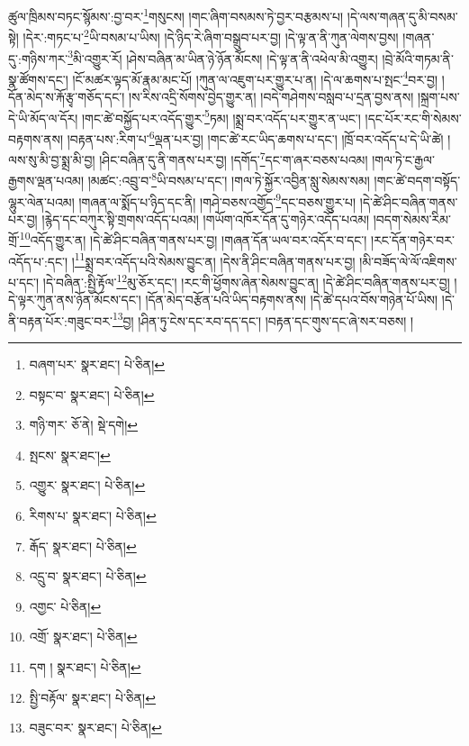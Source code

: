 ཚུལ་ཁྲིམས་བཏང་སྙོམས་:བྱ་བར་\footnote{བཞག་པར་  སྣར་ཐང་།  པེ་ཅིན། }གསུངས། །གང་ཞིག་བསམས་ཏེ་བྱར་བརྩམས་པ། །དེ་ལས་གཞན་དུ་མི་བསམ་སྟེ། །དེར་:གཏང་པ་\footnote{བསྟང་བ་  སྣར་ཐང་།  པེ་ཅིན། }ཡི་བསམ་པ་ཡིས། །དེ་ཉིད་རེ་ཞིག་བསྒྲུབ་པར་བྱ། །དེ་ལྟ་ན་ནི་ཀུན་ལེགས་བྱས། །གཞན་དུ་:གཉིས་ཀར་\footnote{གཉི་གར་  ཅོ་ནེ།  སྡེ་དགེ། }མི་འགྱུར་རོ། །ཤེས་བཞིན་མ་ཡིན་ཉེ་ཉོན་མོངས། །དེ་ལྟ་ན་ནི་འཕེལ་མི་འགྱུར། །བྲེ་མོའི་གཏམ་ནི་སྣ་ཚོགས་དང་། །ངོ་མཚར་ལྟད་མོ་རྣམ་མང་པོ། །ཀུན་ལ་འཇུག་པར་གྱུར་པ་ན། །དེ་ལ་ཆགས་པ་སྤང་\footnote{སྤངས་  སྣར་ཐང་། }བར་བྱ། །དོན་མེད་ས་རྐོ་རྩྭ་གཅོད་དང་། །ས་རིས་འདྲི་སོགས་བྱེད་གྱུར་ན། །བདེ་གཤེགས་བསླབ་པ་དྲན་བྱས་ནས། །སྐྲག་པས་དེ་ཡི་མོད་ལ་དོར། །གང་ཚེ་བསྐྱོད་པར་འདོད་གྱུར་\footnote{འགྱུར་  སྣར་ཐང་།  པེ་ཅིན། }ཏམ། །སྨྲ་བར་འདོད་པར་གྱུར་ན་ཡང་། །དང་པོར་རང་གི་སེམས་བརྟགས་ནས། །བརྟན་པས་:རིག་པ་\footnote{རིགས་པ་  སྣར་ཐང་།  པེ་ཅིན། }ལྡན་པར་བྱ། །གང་ཚེ་རང་ཡིད་ཆགས་པ་དང་། །ཁྲོ་བར་འདོད་པ་དེ་ཡི་ཚེ། །ལས་སུ་མི་བྱ་སྨྲ་མི་བྱ། །ཤིང་བཞིན་དུ་ནི་གནས་པར་བྱ། །དགོད་\footnote{རྒོད་  སྣར་ཐང་།  པེ་ཅིན། }དང་ག་ཞར་བཅས་པའམ། །གལ་ཏེ་ང་རྒྱལ་རྒྱགས་ལྡན་པའམ། །མཚང་:འབྲུ་བ་\footnote{འདྲུ་བ་  སྣར་ཐང་།  པེ་ཅིན། }ཡི་བསམ་པ་དང་། །གལ་ཏེ་སྐྱོར་འབྱིན་སླུ་སེམས་སམ། །གང་ཚེ་བདག་བསྟོད་ལྷུར་ལེན་པའམ། །གཞན་ལ་སྨོད་པ་ཉིད་དང་ནི། །གཤེ་བཅས་འགྱོད་\footnote{འགྱང་  པེ་ཅིན། }དང་བཅས་གྱུར་པ། །དེ་ཚེ་ཤིང་བཞིན་གནས་པར་བྱ། །རྙེད་དང་བཀུར་སྟི་གྲགས་འདོད་པའམ། །གཡོག་འཁོར་དོན་དུ་གཉེར་འདོད་པའམ། །བདག་སེམས་རིམ་གྲོ་\footnote{འགྲོ་  སྣར་ཐང་།  པེ་ཅིན། }འདོད་གྱུར་ན། །དེ་ཚེ་ཤིང་བཞིན་གནས་པར་བྱ། །གཞན་དོན་ཡལ་བར་འདོར་བ་དང་། །རང་དོན་གཉེར་བར་འདོད་པ་:དང་། །\footnote{དག །  སྣར་ཐང་།  པེ་ཅིན། }སྨྲ་བར་འདོད་པའི་སེམས་བྱུང་ན། །དེས་ནི་ཤིང་བཞིན་གནས་པར་བྱ། །མི་བཟོད་ལེ་ལོ་འཇིགས་པ་དང་། །དེ་བཞིན་:སྤྱི་རྟོལ་\footnote{སྤྱི་བརྟོལ་  སྣར་ཐང་།  པེ་ཅིན། }མུ་ཅོར་དང་། །རང་གི་ཕྱོགས་ཞེན་སེམས་བྱུང་ན། །དེ་ཚེ་ཤིང་བཞིན་གནས་པར་བྱ། །དེ་ལྟར་ཀུན་ནས་ཉོན་མོངས་དང་། །དོན་མེད་བརྩོན་པའི་ཡིད་བརྟགས་ནས། །དེ་ཚེ་དཔའ་བོས་གཉེན་པོ་ཡིས། །དེ་ནི་བརྟན་པོར་:གཟུང་བར་\footnote{བཟུང་བར་  སྣར་ཐང་།  པེ་ཅིན། }བྱ། །ཤིན་ཏུ་ངེས་དང་རབ་དད་དང་། །བརྟན་དང་གུས་དང་ཞེ་སར་བཅས། །
